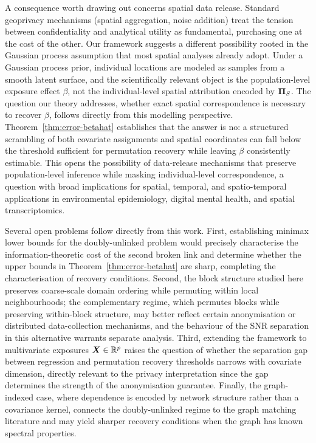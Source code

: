 \documentclass[numsec,webpdf,modern,medium,namedate]{oup-authoring-template}
\theoremstyle{thmstyleone}%
\theoremstyle{thmstyletwo}%
\theoremstyle{thmstylethree}%
\begin{document}
A consequence worth drawing out concerns spatial data release.
Standard geoprivacy mechanisms (spatial aggregation, noise addition) treat the tension between confidentiality and analytical
utility as fundamental, purchasing one at the cost of the other.
Our framework suggests a different possibility rooted in the Gaussian process
assumption that most spatial analyses already adopt.
Under a Gaussian process prior, individual locations are modeled as samples
from a smooth latent surface, and the scientifically relevant object is the
population-level exposure effect $\beta$, not the individual-level spatial
attribution encoded by $\boldsymbol{\Pi}_S$.
The question our theory addresses, whether exact spatial correspondence is
necessary to recover $\beta$, follows directly from this modelling
perspective.
Theorem~\ref{thm:error-betahat} establishes that the answer is no: a
structured scrambling of both covariate assignments and spatial coordinates can
fall below the threshold sufficient for permutation recovery while leaving $\beta$
consistently estimable.
This opens the possibility of data-release mechanisms that preserve
population-level inference while masking individual-level correspondence, a
question with broad implications for spatial, temporal, and spatio-temporal
applications in environmental epidemiology, digital mental health, and spatial
transcriptomics.

Several open problems follow directly from this work.
First, establishing minimax lower bounds for the doubly-unlinked problem would
precisely characterise the information-theoretic cost of the second broken link
and determine whether the upper bounds in Theorem~\ref{thm:error-betahat} are
sharp, completing the characterisation of recovery conditions.
Second, the block structure studied here preserves coarse-scale domain ordering
while permuting within local neighbourhoods; the complementary regime, which
permutes blocks while preserving within-block structure, may better reflect
certain anonymisation or distributed data-collection mechanisms, and the
behaviour of the SNR separation in this alternative warrants separate analysis.
Third, extending the framework to multivariate exposures $\boldsymbol{X}\in\mathbb{R}^p$ raises
the question of whether the separation gap between regression and permutation
recovery thresholds narrows with covariate dimension, directly relevant to
the privacy interpretation since the gap determines the strength of the
anonymisation guarantee.
Finally, the graph-indexed case, where dependence is encoded by network
structure rather than a covariance kernel, connects the doubly-unlinked regime
to the graph matching literature
\citep{arroyo2021maximum, lyzinski2014seeded, fishkind2019seeded,
dawn2025covariate} and may yield sharper recovery conditions when the graph
has known spectral properties.
\end{document}
